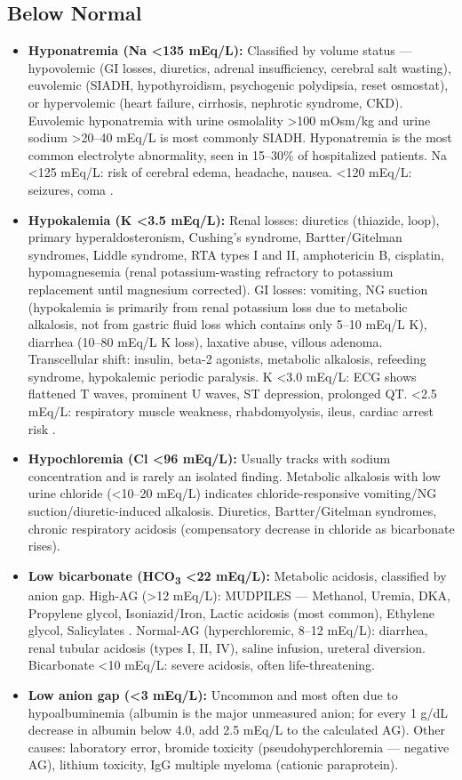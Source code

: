 \subsection*{Below Normal}
\begin{itemize}
  \item \textbf{Hyponatremia (Na <135 mEq/L):} Classified by volume status --- hypovolemic (GI losses, diuretics, adrenal insufficiency, cerebral salt wasting), euvolemic (SIADH, hypothyroidism, psychogenic polydipsia, reset osmostat), or hypervolemic (heart failure, cirrhosis, nephrotic syndrome, CKD). Euvolemic hyponatremia with urine osmolality >100 mOsm/kg and urine sodium >20--40 mEq/L is most commonly SIADH. Hyponatremia is the most common electrolyte abnormality, seen in 15--30\% of hospitalized patients. Na <125 mEq/L: risk of cerebral edema, headache, nausea. <120 mEq/L: seizures, coma \cite{sterns2015disorders}.
  \item \textbf{Hypokalemia (K <3.5 mEq/L):} Renal losses: diuretics (thiazide, loop), primary hyperaldosteronism, Cushing's syndrome, Bartter/Gitelman syndromes, Liddle syndrome, RTA types I and II, amphotericin B, cisplatin, hypomagnesemia (renal potassium-wasting refractory to potassium replacement until magnesium corrected). GI losses: vomiting, NG suction (hypokalemia is primarily from renal potassium loss due to metabolic alkalosis, not from gastric fluid loss which contains only 5--10 mEq/L K), diarrhea (10--80 mEq/L K loss), laxative abuse, villous adenoma. Transcellular shift: insulin, beta-2 agonists, metabolic alkalosis, refeeding syndrome, hypokalemic periodic paralysis. K <3.0 mEq/L: ECG shows flattened T waves, prominent U waves, ST depression, prolonged QT. <2.5 mEq/L: respiratory muscle weakness, rhabdomyolysis, ileus, cardiac arrest risk \cite{gennari1998hypokalemia}.
  \item \textbf{Hypochloremia (Cl <96 mEq/L):} Usually tracks with sodium concentration and is rarely an isolated finding. Metabolic alkalosis with low urine chloride (<10--20 mEq/L) indicates chloride-responsive vomiting/NG suction/diuretic-induced alkalosis. Diuretics, Bartter/Gitelman syndromes, chronic respiratory acidosis (compensatory decrease in chloride as bicarbonate rises).
  \item \textbf{Low bicarbonate (HCO\textsubscript{3} <22 mEq/L):} Metabolic acidosis, classified by anion gap. High-AG (>12 mEq/L): MUDPILES --- Methanol, Uremia, DKA, Propylene glycol, Isoniazid/Iron, Lactic acidosis (most common), Ethylene glycol, Salicylates \cite{kraut2007serum}. Normal-AG (hyperchloremic, 8--12 mEq/L): diarrhea, renal tubular acidosis (types I, II, IV), saline infusion, ureteral diversion. Bicarbonate <10 mEq/L: severe acidosis, often life-threatening.
  \item \textbf{Low anion gap (<3 mEq/L):} Uncommon and most often due to hypoalbuminemia (albumin is the major unmeasured anion; for every 1 g/dL decrease in albumin below 4.0, add 2.5 mEq/L to the calculated AG). Other causes: laboratory error, bromide toxicity (pseudohyperchloremia --- negative AG), lithium toxicity, IgG multiple myeloma (cationic paraprotein).
\end{itemize}

